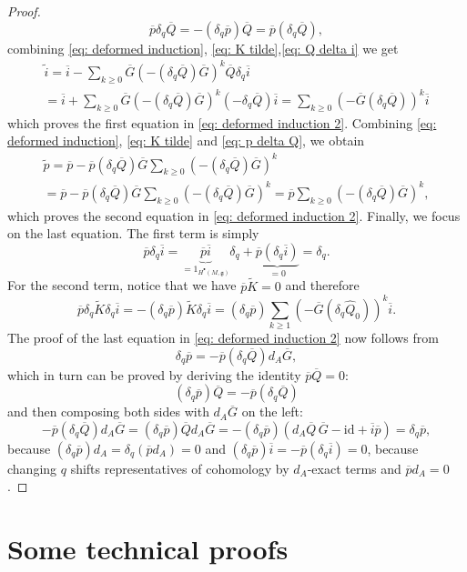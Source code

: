 \documentclass[11pt,a4paper]{amsart}
\theoremstyle{plain} %
\theoremstyle{definition}
\theoremstyle{remark}
\newcommand{\g}{\mathfrak{g}}
\newcommand{\ib}{\overline{i}}
\newcommand{\pb}{\overline{p}}
\newcommand{\Qb}{\overline{Q}}
\newcommand{\Gb}{\overline{G}}
\begin{document}
\begin{proof}
\begin{equation}
     \pb  \delta_q  \Qb  = -(\delta_q\pb) \Qb = \pb(\delta_q\Qb),
 \end{equation}
 combining \eqref{eq: deformed induction}, \eqref{eq: K tilde},\eqref{eq: Q delta i} we get 
 \begin{multline*}
 \widetilde{i} = \ib - \sum_{k \geq 0} \Gb  (-(\delta_q\Qb)  \Gb)^k  \Qb\delta_q \ib \\= \ib + \sum_{k \geq 0} \Gb  (-(\delta_q\Qb)  \Gb)^k  (-\delta_q\Qb) \ib = \sum_{k \geq 0} (-\Gb  (\delta_q\Qb))^k \ib
 \end{multline*} which proves the first equation in \eqref{eq: deformed induction 2}. Combining \eqref{eq: deformed induction}, \eqref{eq: K tilde} and \eqref{eq: p delta Q}, we obtain 
 \begin{multline*}
      \widetilde{p} = \pb - \pb  (\delta_q  \Qb)  \Gb  \sum_{k \geq 0} (-(\delta_q\Qb)  \Gb)^k  \\
      = \pb - \pb  (\delta_q\Qb)  \Gb  \sum_{k \geq 0}(-(\delta_q\Qb)  \Gb)^k = \pb\sum_{k \geq 0}(-(\delta_q\Qb)  \Gb)^k,
 \end{multline*} which proves the second equation in \eqref{eq: deformed induction 2}. Finally, we focus on the last equation. The first term is simply 
 $$ \pb  \delta_q  \ib = \underbrace{\pb \ib}_{=1_{H^\bullet(M,\g)}}  \delta_q + \underbrace{\pb  (\delta_q\ib)}_{=0} = \delta_q.  $$ 
For the second term, notice that we have $\pb  \widetilde{K} = 0$ and therefore
$$ \pb  \delta_q  \widetilde{K}  \delta_q  \ib = -(\delta_q \pb)  \widetilde{K}  \delta_q \ib = (\delta_q\pb)  \sum_{k\geq 1} (-\Gb (\delta_q \widehat{Q}_0))^k  \ib.$$  
The proof of the last equation in \eqref{eq: deformed induction 2} now follows from 
$$\delta_q\pb = -\pb(\delta_q\Qb) d_A  \Gb,$$ 
which in turn can be proved by deriving the identity $\pb  \Qb = 0$: 
$$(\delta_q\pb)\Qb = -\pb (\delta_q\Qb)$$ and then composing both sides with $d_A\Gb$ on the left: 
$$ -\pb (\delta_q\Qb)  d_A  \Gb = (\delta_q\pb) \Qb  d_A  \Gb = - (\delta_q\pb) (d_A  \Qb\,  \Gb - \mathrm{id} + \ib \pb) = \delta_q\pb,$$
because $(\delta_q\pb) d_A = \delta_q(\pb  d_A) = 0$ and $(\delta_q\pb) \ib = - \pb ( \delta_q\ib) = 0$, because changing $q$ shifts representatives of cohomology by $d_A$-exact terms and $\pb d_A=0$.
 \end{proof}



\section{Some technical proofs}
\end{document}
